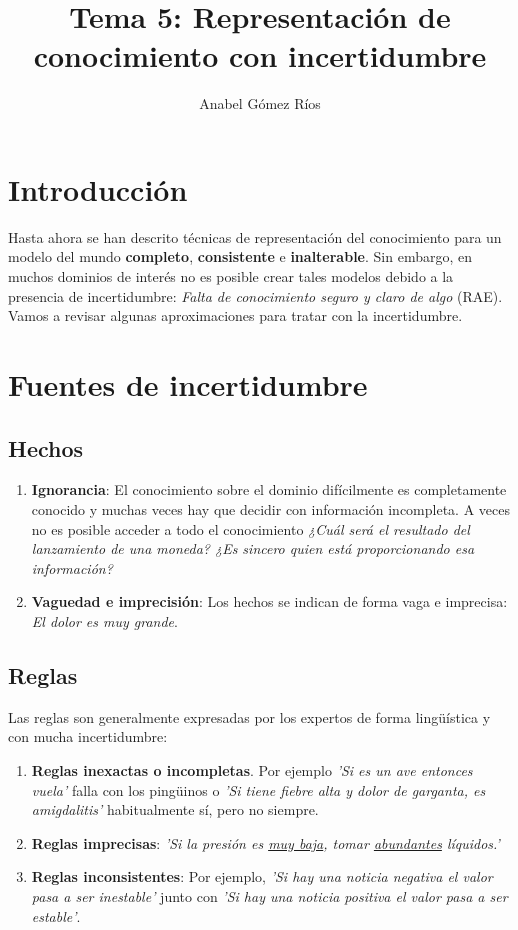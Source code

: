 \documentclass[12pt]{article}
\title{Tema 5: Representación de conocimiento con incertidumbre}
\author{Anabel G\'omez R\'ios}
\begin{document}
\maketitle

\section{Introducción}
Hasta ahora se han descrito técnicas de representación del conocimiento para un modelo del mundo \textbf{completo}, \textbf{consistente} e \textbf{inalterable}. Sin embargo, en muchos dominios de interés no es posible crear tales modelos debido a la presencia de incertidumbre: \textit{Falta de conocimiento seguro y claro de algo} (RAE).\\
Vamos a revisar algunas aproximaciones para tratar con la incertidumbre.

\section{Fuentes de incertidumbre}
\subsection{Hechos}
\begin{enumerate}
\item \textbf{Ignorancia}: El conocimiento sobre el dominio difícilmente es completamente conocido y muchas veces hay que decidir con información incompleta. A veces no es posible acceder a todo el conocimiento \textit{¿Cuál será el resultado del lanzamiento de una moneda? ¿Es sincero quien está proporcionando esa información?}
\item \textbf{Vaguedad e imprecisión}: Los hechos se indican de forma vaga e imprecisa: \textit{El dolor es muy grande}.
\end{enumerate}
\subsection{Reglas}
Las reglas son generalmente expresadas por los expertos de forma lingüística y con mucha incertidumbre:
\begin{enumerate}
\item \textbf{Reglas inexactas o incompletas}. Por ejemplo \textit{'Si es un ave entonces vuela'} falla con los pingüinos o \textit{'Si tiene fiebre alta y dolor de garganta, es amigdalitis'} habitualmente sí, pero no siempre.
\item \textbf{Reglas imprecisas}: \textit{'Si la presión es \underline{muy baja}, tomar \underline{abundantes} líquidos.'}
\item \textbf{Reglas inconsistentes}: Por ejemplo, \textit{'Si hay una noticia negativa el valor pasa a ser inestable'} junto con \textit{'Si hay una noticia positiva el valor pasa a ser estable'}.
\end{enumerate}
\end{document}
